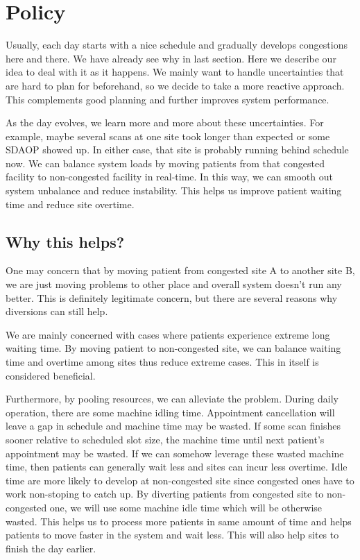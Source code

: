 \section{Policy}



Usually, each day starts with a nice schedule and gradually develops congestions here and there. We have already see why in last section. Here we describe our idea to deal with it as it happens. We mainly want to handle uncertainties that are hard to plan for beforehand, so we decide to take a more reactive approach. This complements good planning and further improves system performance.

As the day evolves, we learn more and more about these uncertainties. For example, maybe several scans at one site took longer than expected or some SDAOP showed up. In either case, that site is probably running behind schedule now. We can balance system loads by moving patients from that congested facility to non-congested facility in real-time. In this way, we can smooth out system unbalance and reduce instability. This helps us improve patient waiting time and reduce site overtime.

\subsection{Why this helps?}

One may concern that by moving patient from congested site A to another site B, we are just moving problems to other place and overall system doesn't run any better. This is definitely legitimate concern, but there are several reasons why diversions can still help.

We are mainly concerned with cases where patients experience extreme long waiting time. By moving patient to non-congested site, we can balance waiting time and overtime among sites thus reduce extreme cases. This in itself is considered beneficial.

Furthermore, by pooling resources, we can alleviate the problem. During daily operation, there are some machine idling time. Appointment cancellation will leave a gap in schedule and machine time may be wasted. If some scan finishes sooner relative to scheduled slot size, the machine time until next patient's appointment may be wasted. If we can somehow leverage these wasted machine time, then patients can generally wait less and sites can incur less overtime. Idle time are more likely to develop at non-congested site since congested ones have to work non-stoping to catch up. By diverting patients from congested site to non-congested one, we will use some machine idle time which will be otherwise wasted. This helps us to process more patients in same amount of time and helps patients to move faster in the system and wait less. This will also help sites to finish the day earlier.


